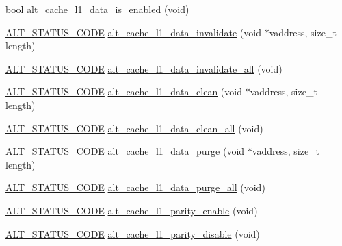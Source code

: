 \begin{DoxyCompactItemize}
\item 
bool \mbox{\hyperlink{group__CACHE__L1_ga1b8079ba3d6940005661269af5a04113}{alt\+\_\+cache\+\_\+l1\+\_\+data\+\_\+is\+\_\+enabled}} (void)
\item 
\mbox{\hyperlink{hwlib_8h_abdb0d369f069723ca55d6c94bcaaaa12}{A\+L\+T\+\_\+\+S\+T\+A\+T\+U\+S\+\_\+\+C\+O\+DE}} \mbox{\hyperlink{group__CACHE__L1_ga5cb15e1f4ec7c3a3d90e377093e6e343}{alt\+\_\+cache\+\_\+l1\+\_\+data\+\_\+invalidate}} (void $\ast$vaddress, size\+\_\+t length)
\item 
\mbox{\hyperlink{hwlib_8h_abdb0d369f069723ca55d6c94bcaaaa12}{A\+L\+T\+\_\+\+S\+T\+A\+T\+U\+S\+\_\+\+C\+O\+DE}} \mbox{\hyperlink{group__CACHE__L1_ga6392aea5f21e92ba6cee7ddc442e778e}{alt\+\_\+cache\+\_\+l1\+\_\+data\+\_\+invalidate\+\_\+all}} (void)
\item 
\mbox{\hyperlink{hwlib_8h_abdb0d369f069723ca55d6c94bcaaaa12}{A\+L\+T\+\_\+\+S\+T\+A\+T\+U\+S\+\_\+\+C\+O\+DE}} \mbox{\hyperlink{group__CACHE__L1_gaada93137c48ec5389a2440f051db1614}{alt\+\_\+cache\+\_\+l1\+\_\+data\+\_\+clean}} (void $\ast$vaddress, size\+\_\+t length)
\item 
\mbox{\hyperlink{hwlib_8h_abdb0d369f069723ca55d6c94bcaaaa12}{A\+L\+T\+\_\+\+S\+T\+A\+T\+U\+S\+\_\+\+C\+O\+DE}} \mbox{\hyperlink{group__CACHE__L1_ga6d7933a103d85385e4e78f8d280ceefc}{alt\+\_\+cache\+\_\+l1\+\_\+data\+\_\+clean\+\_\+all}} (void)
\item 
\mbox{\hyperlink{hwlib_8h_abdb0d369f069723ca55d6c94bcaaaa12}{A\+L\+T\+\_\+\+S\+T\+A\+T\+U\+S\+\_\+\+C\+O\+DE}} \mbox{\hyperlink{group__CACHE__L1_gae17913c31c50609b13379653e920152f}{alt\+\_\+cache\+\_\+l1\+\_\+data\+\_\+purge}} (void $\ast$vaddress, size\+\_\+t length)
\item 
\mbox{\hyperlink{hwlib_8h_abdb0d369f069723ca55d6c94bcaaaa12}{A\+L\+T\+\_\+\+S\+T\+A\+T\+U\+S\+\_\+\+C\+O\+DE}} \mbox{\hyperlink{group__CACHE__L1_gabc52db59c88f6ce2d8d85c8ed6b959cc}{alt\+\_\+cache\+\_\+l1\+\_\+data\+\_\+purge\+\_\+all}} (void)
\item 
\mbox{\hyperlink{hwlib_8h_abdb0d369f069723ca55d6c94bcaaaa12}{A\+L\+T\+\_\+\+S\+T\+A\+T\+U\+S\+\_\+\+C\+O\+DE}} \mbox{\hyperlink{group__CACHE__L1_ga53e8125772688d09fefba728efc544e2}{alt\+\_\+cache\+\_\+l1\+\_\+parity\+\_\+enable}} (void)
\item 
\mbox{\hyperlink{hwlib_8h_abdb0d369f069723ca55d6c94bcaaaa12}{A\+L\+T\+\_\+\+S\+T\+A\+T\+U\+S\+\_\+\+C\+O\+DE}} \mbox{\hyperlink{group__CACHE__L1_ga5ccd83744fcb82e586c02f0d959a35a5}{alt\+\_\+cache\+\_\+l1\+\_\+parity\+\_\+disable}} (void)
\item 

\end{DoxyCompactItemize}
